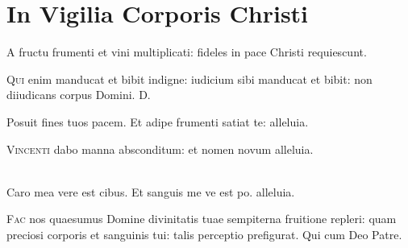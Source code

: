 \chapter{In Vigilia Corporis Christi}

\lettrine{A}{} fructu frumenti et vini multiplicati:
fideles in pace Christi requiescunt.

\lettrine{Q}{ui} enim manducat et bibit indigne:
iudicium sibi manducat et bibit:
non diiudicans corpus Domini. D.


Posuit fines tuos pacem.
Et adipe frumenti satiat te: alleluia.

\lettrine{V}{incenti} dabo manna absconditum: et nomen novum alleluia.

\\
Caro mea vere est cibus.
Et sanguis me ve est po. alleluia.

\lettrine{F}{ac} nos quaesumus Domine
divinitatis tuae sempiterna fruitione repleri:
quam preciosi corporis et sanguinis tui:
talis perceptio prefigurat.
Qui cum Deo Patre.


\headingCantus



